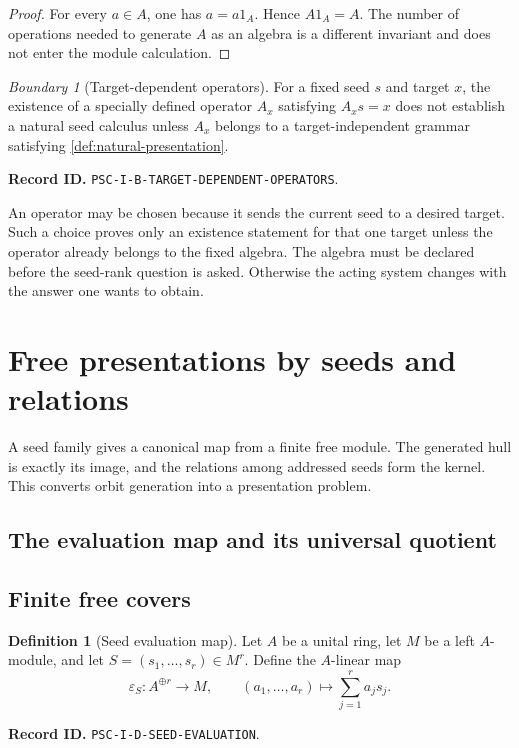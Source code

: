 \documentclass[11pt]{article}
\theoremstyle{definition}
\newtheorem{definition}[definition]{Definition}
\theoremstyle{remark}
\newtheorem{boundary}[boundary]{Boundary}
\newcommand{\RecordID}[1]{\par\smallskip\noindent\begingroup\footnotesize\color{PSCGray}\raggedright\textbf{Record ID.} \nolinkurl{#1}.\par\endgroup}
\begin{document}
\begin{proof}
For every $a\in A$, one has $a=a1_A$.  Hence $A1_A=A$.  The number of operations needed to generate $A$ as an algebra is a different invariant and does not enter the module calculation.
\end{proof}

\begin{boundary}[Target-dependent operators]
\label{bnd:target-dependent-operators}
For a fixed seed $s$ and target $x$, the existence of a specially defined operator $A_x$ satisfying $A_xs=x$ does not establish a natural seed calculus unless $A_x$ belongs to a target-independent grammar satisfying \cref{def:natural-presentation}.
\end{boundary}
\RecordID{PSC-I-B-TARGET-DEPENDENT-OPERATORS}

\begin{warningbox}
An operator may be chosen because it sends the current seed to a desired target.  Such a choice proves only an existence statement for that one target unless the operator already belongs to the fixed algebra.  The algebra must be declared before the seed-rank question is asked.  Otherwise the acting system changes with the answer one wants to obtain.
\end{warningbox}


\section{Free presentations by seeds and relations}
\begin{readerroadmap}
A seed family gives a canonical map from a finite free module.  The generated hull is exactly its image, and the relations among addressed seeds form the kernel.  This converts orbit generation into a presentation problem.
\end{readerroadmap}
\subsection{The evaluation map and its universal quotient}

\subsection{Finite free covers}
\begin{definition}[Seed evaluation map]
\label{def:seed-evaluation}
Let $A$ be a unital ring, let $M$ be a left $A$-module, and let $S=(s_1,\ldots,s_r)\in M^r$.  Define the $A$-linear map
\[
\varepsilon_S:A^{\oplus r}\longrightarrow M,
\qquad
(a_1,\ldots,a_r)\longmapsto\sum_{j=1}^{r}a_js_j.
\]
\end{definition}
\RecordID{PSC-I-D-SEED-EVALUATION}
\end{document}
